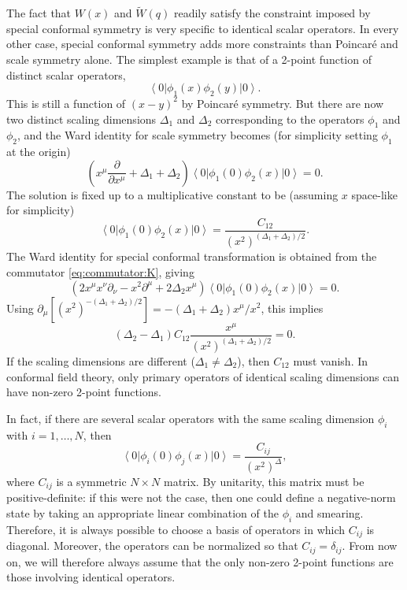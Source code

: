 \documentclass[a4paper,12pt]{article}
\newcommand{\ket}[1]{\left| #1 \right\rangle}
\newcommand{\bra}[1]{\left\langle #1 \right|}
\numberwithin{equation}{section}
\begin{document}
The fact that $W(x)$ and $\widetilde{W}(q)$ readily satisfy the constraint imposed by special conformal symmetry is very specific to identical scalar operators. In every other case, special conformal symmetry adds more constraints than Poincaré and scale symmetry alone.
The simplest example is that of a 2-point function of distinct scalar operators,
\begin{equation}
	\bra{0} \phi_1(x) \phi_2(y) \ket{0}.
\end{equation}
This is still a function of $(x-y)^2$ by Poincaré symmetry. But there are now two distinct scaling dimensions $\Delta_1$ and $\Delta_2$ corresponding to the operators $\phi_1$ and $\phi_2$, and the Ward identity for scale symmetry becomes (for simplicity setting $\phi_1$ at the origin)
\begin{equation}
	\left( x^\mu \frac{\partial}{\partial x^\mu}
	+ \Delta_1 + \Delta_2 \right)
	\bra{0} \phi_1(0) \phi_2(x) \ket{0} = 0.
\end{equation}
The solution is fixed up to a multiplicative constant to be
(assuming $x$ space-like for simplicity)
\begin{equation}
	\bra{0} \phi_1(0) \phi_2(x) \ket{0}
	= \frac{C_{12}}{(x^2)^{(\Delta_1 + \Delta_2)/2}}.
\end{equation}
The Ward identity for special conformal transformation is obtained from the commutator \eqref{eq:commutator:K}, giving
\begin{equation}
	\left( 2 x^\mu x^\nu \partial_\nu - x^2 \partial^\mu 
	+ 2 \Delta_2 x^\mu \right)
	\bra{0} \phi_1(0) \phi_2(x) \ket{0}
	= 0.
\end{equation}
Using $\partial_\mu \left[ (x^2)^{-(\Delta_1 + \Delta_2)/2} \right] = -(\Delta_1 + \Delta_2) x^\mu / x^2$, this implies
\begin{equation}
	\left( \Delta_2 - \Delta_1 \right) C_{12} 
	\frac{x^\mu}{(x^2)^{(\Delta_1 + \Delta_2)/2}} = 0.
\end{equation}
If the scaling dimensions are different ($\Delta_1 \neq \Delta_2$), then $C_{12}$ must vanish. In conformal field theory, only primary operators of identical scaling dimensions can have non-zero 2-point functions.

In fact, if there are several scalar operators with the same scaling dimension $\phi_i$ with $i = 1, \ldots, N$, then 
\begin{equation}
	\bra{0} \phi_i(0) \phi_j(x) \ket{0}
	= \frac{C_{ij}}{(x^2)^\Delta},
\end{equation}
where $C_{ij}$ is a symmetric $N \times N$ matrix. By unitarity, this matrix must be positive-definite: if this were not the case, then one could define a negative-norm state by taking an appropriate linear combination of the $\phi_i$ and smearing. Therefore, it is always possible to choose a basis of operators in which $C_{ij}$ is diagonal. Moreover, the operators can be normalized so that $C_{ij} = \delta_{ij}$. From now on, we will therefore always assume that the only non-zero 2-point functions are those involving identical operators.
\end{document}
